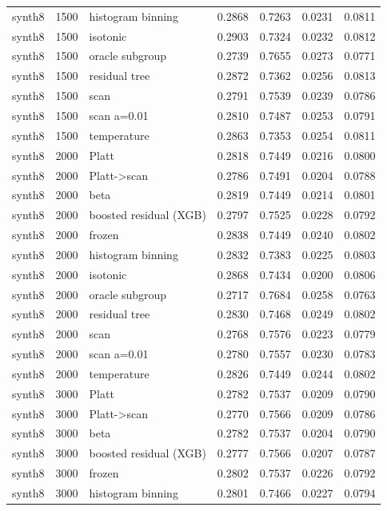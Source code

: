 \begin{tabular}{lllrrrr}
synth8 & 1500 & histogram binning & 0.2868 & 0.7263 & 0.0231 & 0.0811 \\
synth8 & 1500 & isotonic & 0.2903 & 0.7324 & 0.0232 & 0.0812 \\
synth8 & 1500 & oracle subgroup & 0.2739 & 0.7655 & 0.0273 & 0.0771 \\
synth8 & 1500 & residual tree & 0.2872 & 0.7362 & 0.0256 & 0.0813 \\
synth8 & 1500 & scan & 0.2791 & 0.7539 & 0.0239 & 0.0786 \\
synth8 & 1500 & scan a=0.01 & 0.2810 & 0.7487 & 0.0253 & 0.0791 \\
synth8 & 1500 & temperature & 0.2863 & 0.7353 & 0.0254 & 0.0811 \\
synth8 & 2000 & Platt & 0.2818 & 0.7449 & 0.0216 & 0.0800 \\
synth8 & 2000 & Platt->scan & 0.2786 & 0.7491 & 0.0204 & 0.0788 \\
synth8 & 2000 & beta & 0.2819 & 0.7449 & 0.0214 & 0.0801 \\
synth8 & 2000 & boosted residual (XGB) & 0.2797 & 0.7525 & 0.0228 & 0.0792 \\
synth8 & 2000 & frozen & 0.2838 & 0.7449 & 0.0240 & 0.0802 \\
synth8 & 2000 & histogram binning & 0.2832 & 0.7383 & 0.0225 & 0.0803 \\
synth8 & 2000 & isotonic & 0.2868 & 0.7434 & 0.0200 & 0.0806 \\
synth8 & 2000 & oracle subgroup & 0.2717 & 0.7684 & 0.0258 & 0.0763 \\
synth8 & 2000 & residual tree & 0.2830 & 0.7468 & 0.0249 & 0.0802 \\
synth8 & 2000 & scan & 0.2768 & 0.7576 & 0.0223 & 0.0779 \\
synth8 & 2000 & scan a=0.01 & 0.2780 & 0.7557 & 0.0230 & 0.0783 \\
synth8 & 2000 & temperature & 0.2826 & 0.7449 & 0.0244 & 0.0802 \\
synth8 & 3000 & Platt & 0.2782 & 0.7537 & 0.0209 & 0.0790 \\
synth8 & 3000 & Platt->scan & 0.2770 & 0.7566 & 0.0209 & 0.0786 \\
synth8 & 3000 & beta & 0.2782 & 0.7537 & 0.0204 & 0.0790 \\
synth8 & 3000 & boosted residual (XGB) & 0.2777 & 0.7566 & 0.0207 & 0.0787 \\
synth8 & 3000 & frozen & 0.2802 & 0.7537 & 0.0226 & 0.0792 \\
synth8 & 3000 & histogram binning & 0.2801 & 0.7466 & 0.0227 & 0.0794 \\

\end{tabular}
